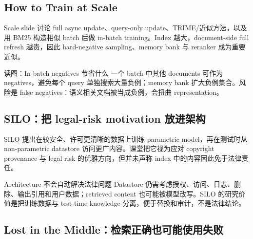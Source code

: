 \subsection{How to Train at Scale}

Scale slide 讨论 full async update、query-only update、TRIME/近似方法，以及用 BM25 构造相似 batch 后做 in-batch training。Index 越大，document-side full refresh 越贵，因此 hard-negative sampling、memory bank 与 reranker 成为重要近似。


\begin{knowledgebox}{读图：In-batch negatives 节省什么}
一个 batch 中其他 documents 可作为 negatives，避免每个 query 单独搜索大量负例；memory bank 扩大负例集合。风险是 false negatives：语义相关文档被当成负例，会扭曲 representation。
\end{knowledgebox}

\subsection{SILO：把 legal-risk motivation 放进架构}

SILO 提出在较安全、许可更清晰的数据上训练 parametric model，再在测试时从 non-parametric datastore 访问更广内容。课堂把它视为应对 copyright provenance 与 legal risk 的优雅方向，但并未声称 index 中的内容因此免于法律责任。


\begin{warningbox}{Architecture 不会自动解决法律问题}
Datastore 仍需考虑授权、访问、日志、删除、输出引用和用户数据；retrieved content 也可能被模型改写。SILO 的研究价值是把训练数据与 test-time knowledge 分离，便于替换和审计，不是法律结论。
\end{warningbox}


\subsection{Lost in the Middle：检索正确也可能使用失败}

